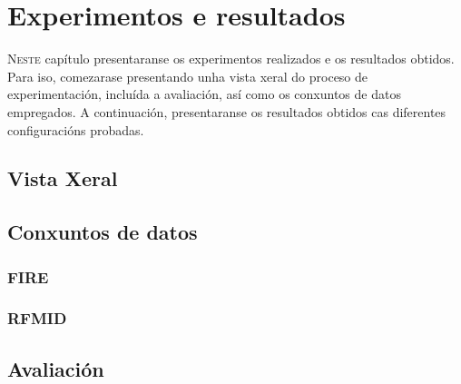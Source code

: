 \chapter{Experimentos e resultados}
\label{chap:Experimentos e resultados}
\lettrine{N}{este} capítulo presentaranse os experimentos realizados e os resultados obtidos.
Para iso, comezarase presentando unha vista xeral do proceso de experimentación, incluída a avaliación, así como os conxuntos de datos empregados.
A continuación, presentaranse os resultados obtidos cas diferentes configuracións probadas.

\section{Vista Xeral}
\label{sec:Vista Xeral}

\section{Conxuntos de datos}
\label{sec:Conxuntos de datos}

\subsection{FIRE}
\label{subsec:FIRE}

\subsection{RFMID}
\label{subsec:RFMID}

\section{Avaliación}
\label{sec:Avaliación}
